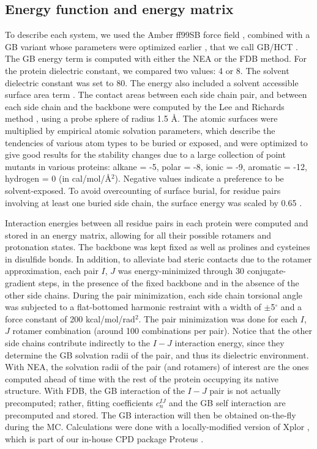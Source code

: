 \documentclass[a4paper,12pt]{article}
\begin{document}
\subsection{Energy function and energy matrix}
To describe each system, we used the Amber ff99SB force field \cite{Cornell95,Ponder03}, combined with a GB variant
whose parameters were optimized earlier \cite{Lopes07}, that we call GB/HCT \cite{Hawkins95,Moulinier03}. The GB energy
term is computed with either the NEA or the FDB method. For the protein dielectric constant, we compared two values:
4 or 8. The solvent dielectric constant was set to 80. The energy also included a solvent accessible surface area
term \cite{Lopes07,Schmidt08b}. The contact areas between each side chain pair, and between each side chain and the
backbone were computed by the Lee and Richards method \cite{Richards77}, using a probe sphere of radius 1.5 \AA. The
atomic surfaces were multiplied by empirical atomic solvation parameters, which describe the tendencies of various
atom types to be buried or exposed, and were optimized to give good results for the stability changes due to a large
collection of point mutants in various proteins: alkane = -5, polar = -8, ionic = -9, aromatic = -12, hydrogen = 0
(in cal/mol/\AA$^2$). Negative values indicate a preference to be solvent-exposed. To avoid overcounting of surface
burial, for residue pairs involving at least one buried side chain, the surface energy was scaled by 0.65 \cite{Lopes07,
Schmidt08,Polydorides13,Gaillard14}. 

Interaction energies between all residue pairs in each protein were computed and stored in an energy matrix, allowing
for all their possible rotamers and protonation states. The backbone was kept fixed as well as prolines and cysteines
in disulfide bonds. In addition, to alleviate bad steric contacts due to the rotamer approximation, each pair $I$, $J$
was energy-minimized through 30 conjugate-gradient steps, in the presence of the fixed backbone and in the absence of the
other side chains. During the pair minimization, each side chain torsional angle was subjected to a flat-bottomed harmonic
restraint with a width of $\pm$5$^{\circ}$ and a force constant of 200 kcal/mol/rad$^2$. The pair minimization was done for
each $I$, $J$ rotamer combination (around 100 combinations per pair). Notice that the other side chains contribute indirectly
to the $I-J$ interaction energy, since they determine the GB solvation radii of the pair, and thus its dielectric environment.
With NEA, the solvation radii of the pair (and rotamers) of interest are the ones computed ahead of time with the rest of
the protein occupying its native structure. With FDB, the GB interaction of the $I-J$ pair is not actually precomputed;
rather, fitting coefficients $c_n^{IJ}$ and the GB self interaction are precomputed and stored. The GB interaction will
then be obtained on-the-fly during the MC. Calculations were done with a locally-modified version of Xplor \cite{Xplor},
which is part of our in-house CPD package Proteus \cite{Schmidt08,Simonson13b}. 
\end{document}
